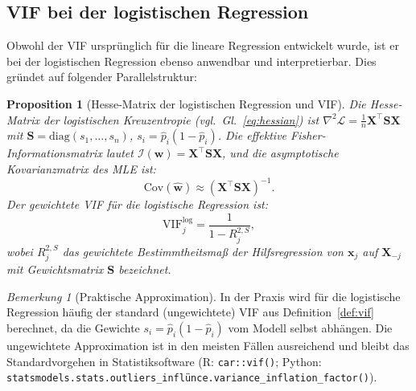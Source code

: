 ﻿\documentclass[12pt, a4paper]{article}
\newtheorem{proposition}[theorem]{Proposition}
\theoremstyle{definition}
\theoremstyle{remark}
\newtheorem{remark}[theorem]{Bemerkung}
\newcommand{\vw}{\bm{w}}
\newcommand{\vx}{\bm{x}}
\newcommand{\vX}{\bm{X}}
\newcommand{\vS}{\bm{S}}
\newcommand{\T}{\top}
\newcommand{\diag}{\mathrm{diag}}
\begin{document}
\subsection{VIF bei der logistischen Regression}

Obwohl der VIF ursprünglich für die lineare Regression entwickelt wurde, ist er bei der
logistischen Regression ebenso anwendbar und interpretierbar. Dies gründet auf folgender
Parallelstruktur:

\begin{proposition}[Hesse-Matrix der logistischen Regression und VIF]
	Die Hesse-Matrix der logistischen Kreuzentropie (vgl.~Gl.~\eqref{eq:hessian}) ist
	$\nabla^2\mathcal{L} = \frac{1}{n}\vX^\T\vS\vX$ mit $\vS = \diag(s_1,\ldots,s_n)$,
	$s_i = \hat{p}_i(1-\hat{p}_i)$. Die effektive Fisher-Informationsmatrix lautet
	$\mathcal{I}(\vw) = \vX^\T\vS\vX$, und die asymptotische Kovarianzmatrix des MLE ist:
	\begin{equation}
		\mathrm{Cov}(\hat{\vw}) \approx (\vX^\T\vS\vX)^{-1}.
		\label{eq:cov_logistic}
	\end{equation}
	Der \emph{gewichtete VIF} für die logistische Regression ist:
	\begin{equation}
		\mathrm{VIF}_j^{\mathrm{log}} = \frac{1}{1 - R_j^{2,S}},
		\label{eq:vif_logistic}
	\end{equation}
	wobei $R_j^{2,S}$ das gewichtete Bestimmtheitsmaß der Hilfsregression von $\vx_j$ auf
	$\vX_{-j}$ mit Gewichtsmatrix $\vS$ bezeichnet.
\end{proposition}

\begin{remark}[Praktische Approximation]
	In der Praxis wird für die logistische Regression häufig der standard (ungewichtete)
	VIF aus Definition~\ref{def:vif} berechnet, da die Gewichte $s_i = \hat{p}_i(1-\hat{p}_i)$
	vom Modell selbst abhängen. Die ungewichtete Approximation ist in den meisten Fällen
	ausreichend und bleibt das Standardvorgehen in Statistiksoftware
	(R: \texttt{car::vif()}; Python: \texttt{statsmodels.stats.outliers\_inflünce.variance\_inflation\newline \_factor()}).
\end{remark}
\end{document}
